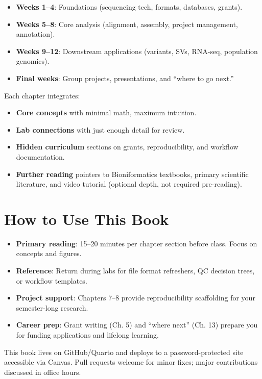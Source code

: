 \documentclass[
  letterpaper,
  DIV=11,
  numbers=noendperiod]{scrreprt}
\providecommand{\tightlist}{%
  \setlength{\itemsep}{0pt}\setlength{\parskip}{0pt}}
\begin{document}
\begin{itemize}
\tightlist
\item
  \textbf{Weeks 1--4}: Foundations (sequencing tech, formats, databases,
  grants).
\item
  \textbf{Weeks 5--8}: Core analysis (alignment, assembly, project
  management, annotation).
\item
  \textbf{Weeks 9--12}: Downstream applications (variants, SVs, RNA-seq,
  population genomics).
\item
  \textbf{Final weeks}: Group projects, presentations, and ``where to go
  next.''
\end{itemize}

Each chapter integrates:

\begin{itemize}
\item
  \textbf{Core concepts} with minimal math, maximum intuition.
\item
  \textbf{Lab connections} with just enough detail for review.
\item
  \textbf{Hidden curriculum} sections on grants, reproducibility, and
  workflow documentation.
\item
  \textbf{Further reading} pointers to Bioniformatics textbooks, primary
  scientific literature, and video tutorial (optional depth, not
  required pre-reading).
\end{itemize}

\section{How to Use This Book}\label{how-to-use-this-book}

\begin{itemize}
\tightlist
\item
  \textbf{Primary reading}: 15--20 minutes per chapter section before
  class. Focus on concepts and figures.
\item
  \textbf{Reference}: Return during labs for file format refreshers, QC
  decision trees, or workflow templates.
\item
  \textbf{Project support}: Chapters 7--8 provide reproducibility
  scaffolding for your semester-long research.
\item
  \textbf{Career prep}: Grant writing (Ch. 5) and ``where next'' (Ch.
  13) prepare you for funding applications and lifelong learning.
\end{itemize}

This book lives on GitHub/Quarto and deploys to a password-protected
site accessible via Canvas. Pull requests welcome for minor fixes; major
contributions discussed in office hours.
\end{document}
